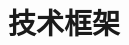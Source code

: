 \section{技术框架}

\begin{comment}
\subsection{理论模型:分布共享数据服务}

\begin{frame}{分布共享数据服务}
  \begin{columns}
	\column{0.50\textwidth}
	  \fignocaption{width = 0.60\textwidth}{figures/shared-data-clients.pdf}
	  \begin{center}
		共享数据系统
	  \end{center}
	\pause
	\column{0.50\textwidth}
	  \fignocaption{width = 0.70\textwidth}{figures/distributed-data-clients.pdf}
	  \begin{center}
		分布数据系统
	  \end{center}
  \end{columns}
\end{frame}
\begin{frame}{分布共享数据服务}
  \fignocaption{width = 0.45\textwidth}{figures/distributed-shared-data-clients.pdf}
  \begin{center}
	分布共享数据服务作为中间件管理分布数据
  \end{center}
\end{frame}
\begin{frame}{分布共享数据服务}
  \fignocaption{width = 0.35\textwidth}{figures/dsds.pdf}
  \begin{center}
	\textcolor{blue!80}{分布共享数据服务 \term{中间件}:} 在分布数据之上提供共享数据的抽象
  \end{center}
\end{frame}
\begin{frame}{分布共享数据服务 (注)}
  \begin{center}
	分布共享内存模型 (多处理器系统)\\
	\textcolor{blue}{[传统概念]}\\
	\vspace{0.10cm} +\\ \vspace{0.10cm}
	分布数据系统\\
	\textcolor{blue}{[新平台]}
	

\end{comment}
